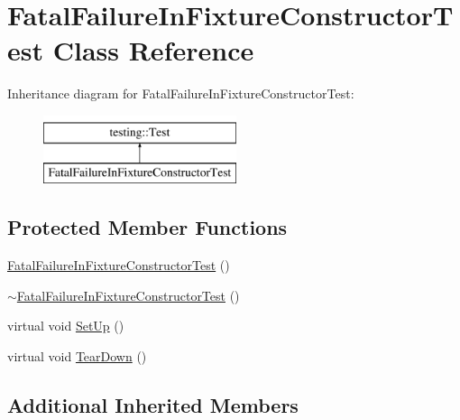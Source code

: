 \hypertarget{class_fatal_failure_in_fixture_constructor_test}{\section{Fatal\-Failure\-In\-Fixture\-Constructor\-Test Class Reference}
\label{class_fatal_failure_in_fixture_constructor_test}
}
Inheritance diagram for Fatal\-Failure\-In\-Fixture\-Constructor\-Test\-:\begin{figure}[H]
\begin{center}
\leavevmode
\includegraphics[height=2.000000cm]{class_fatal_failure_in_fixture_constructor_test}
\end{center}
\end{figure}
\subsection*{Protected Member Functions}
\begin{DoxyCompactItemize}
\item 
\hyperlink{class_fatal_failure_in_fixture_constructor_test_a1dc9a5fcf0e1f22d614990a0fe2cb504}{Fatal\-Failure\-In\-Fixture\-Constructor\-Test} ()
\item 
\hyperlink{class_fatal_failure_in_fixture_constructor_test_a514709af7159172a12193a7508683c46}{$\sim$\-Fatal\-Failure\-In\-Fixture\-Constructor\-Test} ()
\item 
virtual void \hyperlink{class_fatal_failure_in_fixture_constructor_test_a006d3ac0e7a4ad3c469c3b41dc7c42c3}{Set\-Up} ()
\item 
virtual void \hyperlink{class_fatal_failure_in_fixture_constructor_test_a2763026a557e1fce4e59bd16c4eced57}{Tear\-Down} ()
\end{DoxyCompactItemize}
\subsection*{Additional Inherited Members}


